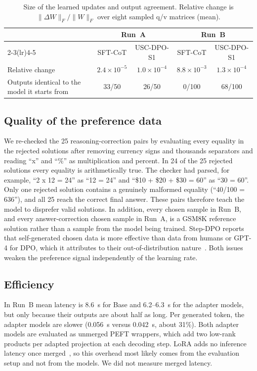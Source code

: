 \documentclass[11pt, a4paper]{article}
\newcommand{\soldpo}{USC-DPO-S1}
\begin{document}
\begin{table}[t]
\centering
\caption{Size of the learned updates and output agreement. Relative change is $\|\Delta W\|_F/\|W\|_F$ over eight sampled q/v matrices (mean).}
\label{tab:diag}
\small
\begin{tabular}{lcccc}
\toprule
 & \multicolumn{2}{c}{\textbf{Run~A}} & \multicolumn{2}{c}{\textbf{Run~B}} \\
\cmidrule(lr){2-3}\cmidrule(lr){4-5}
 & SFT-CoT & \soldpo{} & SFT-CoT & \soldpo{} \\
\midrule
Relative change & $2.4\times10^{-5}$ & $1.0\times10^{-4}$ & $8.8\times10^{-3}$ & $1.3\times10^{-4}$ \\
Outputs identical to the model it starts from & 33/50 & 26/50 & 0/100 & 68/100 \\
\bottomrule
\end{tabular}
\end{table}

\subsection{Quality of the preference data}
We re-checked the 25 reasoning-correction pairs by evaluating every equality in the rejected solutions after removing currency signs and thousands separators and reading ``x'' and ``\%'' as multiplication and percent. In 24 of the 25 rejected solutions every equality is arithmetically true. The checker had parsed, for example, ``2 x 12 = 24'' as ``12 = 24'' and ``\$10 + \$20 + \$30 = 60'' as ``30 = 60''. Only one rejected solution contains a genuinely malformed equality (``40/100 = 636''), and all 25 reach the correct final answer. These pairs therefore teach the model to disprefer valid solutions. In addition, every chosen sample in Run~B, and every answer-correction chosen sample in Run~A, is a GSM8K reference solution rather than a sample from the model being trained. Step-DPO reports that self-generated chosen data is more effective than data from humans or GPT-4 for DPO, which it attributes to their out-of-distribution nature~\cite{lai2024stepdpo}. Both issues weaken the preference signal independently of the learning rate.

\subsection{Efficiency}
In Run~B mean latency is 8.6~s for Base and 6.2--6.3~s for the adapter models, but only because their outputs are about half as long. Per generated token, the adapter models are slower (0.056~s versus 0.042~s, about 31\%). Both adapter models are evaluated as unmerged PEFT wrappers, which add two low-rank products per adapted projection at each decoding step. LoRA adds no inference latency once merged~\cite{hu2022lora}, so this overhead most likely comes from the evaluation setup and not from the models. We did not measure merged latency.
\end{document}
